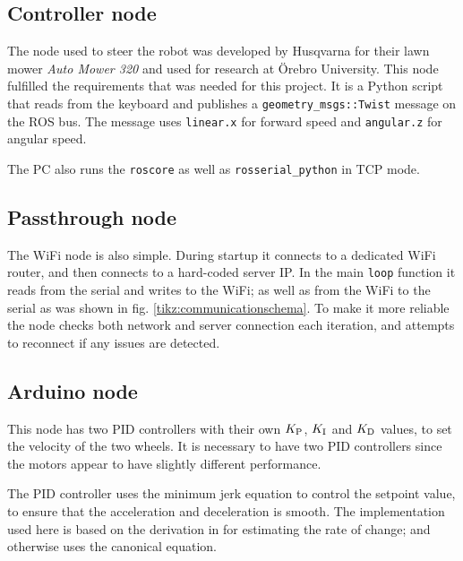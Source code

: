 \documentclass[11pt]{article}
\begin{document}
\newpage


\subsection{Controller node}
\label{subsec:cn}
The node used to steer the robot was developed by Husqvarna for their lawn mower
\emph{Auto Mower 320} and used for research at Örebro University. This node
fulfilled the requirements that was needed for this project. It is a Python
script that reads from the keyboard and publishes a
\texttt{geometry\_msgs::Twist} message on the ROS bus. The message uses
\texttt{linear.x} for forward speed and \texttt{angular.z} for angular speed.

The PC also runs the \texttt{roscore} as well as \texttt{rosserial\_python} in
TCP mode.


\subsection{Passthrough node}
\label{subsec:ptn}
The WiFi node is also simple. During startup it connects to a dedicated WiFi
router, and then connects to a hard-coded server IP. In the main \texttt{loop}
function it reads from the serial and writes to the WiFi; as well as from the
WiFi to the serial as was shown in fig. \vref{tikz:communicationschema}. To make
it more reliable the node checks both network and server connection each
iteration, and attempts to reconnect if any issues are detected. \par
\subsection{Arduino node}
\label{subsec:dd}
This node has two PID controllers with their own ${K_{\textup{P}}}$, ${K_{\textup{I}}}$ and
${K_{\textup{D}}}$ values, to set the velocity of the two wheels. It is necessary to
have two PID controllers since the motors appear to have slightly different
performance. \par

The PID controller uses the minimum jerk equation to control the setpoint value,
to ensure that the acceleration and deceleration is smooth. The implementation
used here is based on the derivation in \cite{mje} for estimating the rate of
change; and otherwise uses the canonical equation. \par
\end{document}
